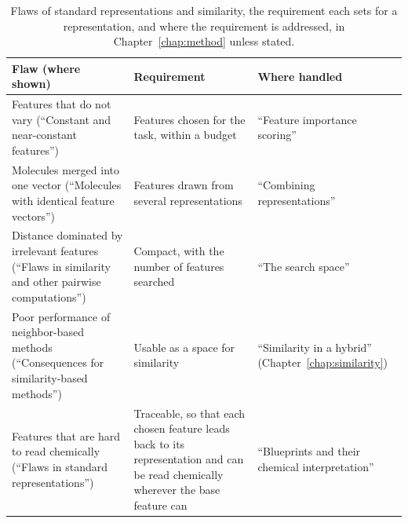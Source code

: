 \begin{table}[htbp]
\centering
\small
\begin{adjustbox}{max width=\textwidth,max totalheight=0.78\textheight}
\begin{tabular}{P{0.34\textwidth}P{0.30\textwidth}P{0.28\textwidth}}
\toprule
Flaw (where shown) & Requirement & Where handled \\
\midrule
Features that do not vary (``Constant and near-constant features'') & Features chosen for the task, within a budget & ``Feature importance scoring'' \\
Molecules merged into one vector (``Molecules with identical feature vectors'') & Features drawn from several representations & ``Combining representations'' \\
Distance dominated by irrelevant features (``Flaws in similarity and other pairwise computations'') & Compact, with the number of features searched & ``The search space'' \\
Poor performance of neighbor-based methods (``Consequences for similarity-based methods'') & Usable as a space for similarity & ``Similarity in a hybrid'' (Chapter~\ref{chap:similarity}) \\
Features that are hard to read chemically (``Flaws in standard representations'') & Traceable, so that each chosen feature leads back to its representation and can be read chemically wherever the base feature can & ``Blueprints and their chemical interpretation'' \\
\bottomrule
\end{tabular}
\end{adjustbox}
\caption[Flaws of standard representations and similarity, and the requirement each sets.]{Flaws of standard representations and similarity, the requirement each sets for a representation, and where the requirement is addressed, in Chapter~\ref{chap:method} unless stated.}
\label{tab:flaws:requirements}
\end{table}


